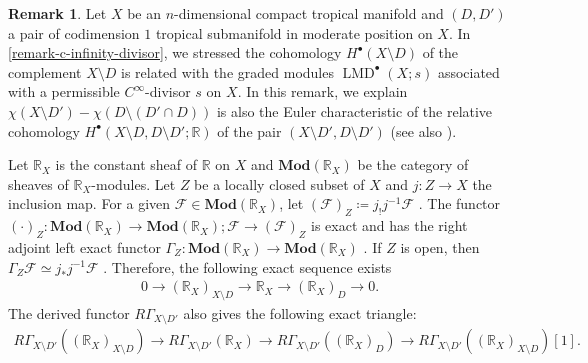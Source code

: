 \documentclass[a4paper,dvipdfmx,reqno,12pt]{amsart}
\theoremstyle{definition}
\newtheorem{remark}[theorem]{Remark}
\newcommand{\deq}{\coloneqq}
\newcommand{\opn}[1]{\operatorname{#1}}
\newcommand{\catn}[1]{\mathbf{#1}}
\numberwithin{equation}{section}
\begin{document}
\begin{remark}
Let $X$ be an $n$-dimensional compact tropical manifold
and $(D,D')$ a pair of
codimension $1$ tropical submanifold in moderate position
on $X$.
In \cref{remark-c-infinity-divisor},
we stressed
the cohomology $H^{\bullet}(X\setminus D)$ of
the complement $X\setminus D$ is related with
the graded modules $\opn{LMD}^{\bullet}(X;s)$
associated with a permissible
$C^{\infty}$-divisor $s$ on $X$.
In this remark, we explain
$\chi(X\setminus D')-\chi(D\setminus (D'\cap D))$
is also the Euler characteristic of
the relative cohomology 
$H^{\bullet}(X\setminus D,D\setminus D';\mathbb{R})$
of the pair
$(X\setminus D', D\setminus D')$
\cite[Chapter IV. Definition 8.1]{MR842190}
(see also \cite[Chapter II. Proposition 12.3]{MR1481706}).

Let $\mathbb{R}_X$ is the constant sheaf of $\mathbb{R}$
on $X$ and 
$\catn{Mod}(\mathbb{R}_X)$ be the category of sheaves of 
$\mathbb{R}_X$-modules.
Let $Z$ be a locally closed subset of $X$ and
$j\colon Z\to X$ the inclusion map.
For a given $\mathcal{F}\in \catn{Mod}(\mathbb{R}_X)$,
let $(\mathcal{F})_{Z}\deq j_!j^{-1}\mathcal{F}$ 
\cite[Proposition 2.3.6]{MR1299726}.
The functor
$(\cdot)_{Z}\colon \catn{Mod}(\mathbb{R}_X) \to
\catn{Mod}(\mathbb{R}_X);
\mathcal{F}\to (\mathcal{F})_Z$ is exact and has
the right adjoint left exact functor 
$\Gamma_{Z}\colon \catn{Mod}(\mathbb{R}_X) \to
\catn{Mod}(\mathbb{R}_X)$
\cite[Definition 2.3.8]{MR1299726}.
If $Z$ is open, then
$\Gamma_{Z}\mathcal{F}\simeq
j_*j^{-1}\mathcal{F}$
\cite[Proposition 2.3.9 (iii)]{MR1299726}.
Therefore, the following exact sequence exists
\begin{align}
\label{equation-closed-open-exact}
0 \to (\mathbb{R}_X)_{X\setminus D}
\to \mathbb{R}_X \to (\mathbb{R}_X)_{D} \to 0.
\end{align}
The derived functor $R\Gamma_{X\setminus D'}$ also gives
the following exact triangle:
\begin{align}
R\Gamma_{X\setminus D'}((\mathbb{R}_X)_{X\setminus D})
\to  R\Gamma_{X\setminus D'}(\mathbb{R}_X)
\to R\Gamma_{X\setminus D'}((\mathbb{R}_X)_D)
\to R\Gamma_{X\setminus D'}((\mathbb{R}_X)_{X\setminus D})[1].
\end{align}



\end{remark}
\end{document}
